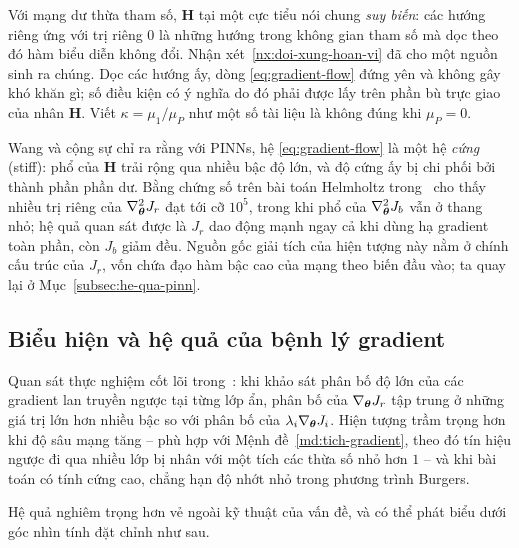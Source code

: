 \begin{nhanxet}
Với mạng dư thừa tham số, $\bm{H}$ tại một cực tiểu nói chung \emph{suy biến}:
các hướng riêng ứng với trị riêng $0$ là những hướng trong không gian tham số mà
dọc theo đó hàm biểu diễn không đổi. Nhận xét~\ref{nx:doi-xung-hoan-vi} đã cho
một nguồn sinh ra chúng. Dọc các hướng ấy, dòng \eqref{eq:gradient-flow} đứng
yên và không gây khó khăn gì; số điều kiện có ý nghĩa do đó phải được lấy trên
phần bù trực giao của nhân $\bm{H}$. Viết $\kappa = \mu_1/\mu_P$ như một số tài
liệu là không đúng khi $\mu_P = 0$.
\end{nhanxet}
 
Wang và cộng sự chỉ ra rằng với PINNs, hệ \eqref{eq:gradient-flow} là một hệ
\emph{cứng} (stiff): phổ của $\bm{H}$ trải rộng qua nhiều bậc độ lớn, và độ cứng
ấy bị chi phối bởi thành phần phần dư. Bằng chứng số trên bài toán Helmholtz
trong~\cite{wang2021} cho thấy nhiều trị riêng của $\nabla^2_{\bm{\theta}}J_r$ đạt
tới cỡ $10^{5}$, trong khi phổ của $\nabla^2_{\bm{\theta}}J_b$ vẫn ở thang nhỏ; hệ
quả quan sát được là $J_r$ dao động mạnh ngay cả khi dùng hạ gradient toàn phần,
còn $J_b$ giảm đều. Nguồn gốc giải tích của hiện tượng này nằm ở chính cấu trúc
của $J_r$, vốn chứa đạo hàm bậc cao của mạng theo biến đầu vào; ta quay lại ở
Mục~\ref{subsec:he-qua-pinn}.
 
\subsection{Biểu hiện và hệ quả của bệnh lý gradient}
\label{subsec:bieu-hien}
 
Quan sát thực nghiệm cốt lõi trong~\cite{wang2021}: khi khảo sát phân bố độ lớn
của các gradient lan truyền ngược tại từng lớp ẩn, phân bố của
$\nabla_{\bm{\theta}} J_{r}$ tập trung ở những giá trị lớn hơn nhiều bậc so với phân
bố của $\lambda_{i} \nabla_{\bm{\theta}} J_{i}$. Hiện tượng trầm trọng hơn khi độ sâu
mạng tăng -- phù hợp với Mệnh đề~\ref{md:tich-gradient}, theo đó tín hiệu ngược
đi qua nhiều lớp bị nhân với một tích các thừa số nhỏ hơn $1$ -- và khi bài toán
có tính cứng cao, chẳng hạn độ nhớt nhỏ trong phương trình Burgers.
 
Hệ quả nghiêm trọng hơn vẻ ngoài kỹ thuật của vấn đề, và có thể phát biểu dưới
góc nhìn tính đặt chỉnh như sau.
 
